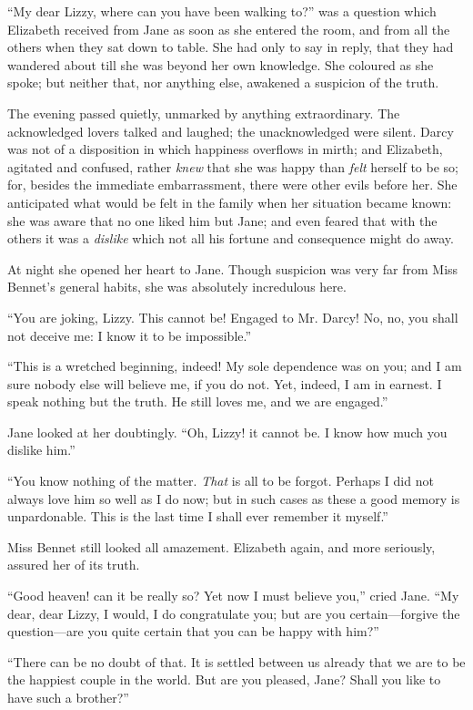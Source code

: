 ``My dear Lizzy, where can you have been walking to?'' was a question which Elizabeth received from Jane as soon as she entered the room, and from all the others when they sat down to table. She had only to say in reply, that they had wandered about till she was beyond her own knowledge. She coloured as she spoke; but neither that, nor anything else, awakened a suspicion of the truth.

The evening passed quietly, unmarked by anything extraordinary. The acknowledged lovers talked and laughed; the unacknowledged were silent. Darcy was not of a disposition in which happiness overflows in mirth; and Elizabeth, agitated and confused, rather \textit{knew} that she was happy than \textit{felt} herself to be so; for, besides the immediate embarrassment, there were other evils before her. She anticipated what would be felt in the family when her situation became known: she was aware that no one liked him but Jane; and even feared that with the others it was a \textit{dislike} which not all his fortune and consequence might do away.

At night she opened her heart to Jane. Though suspicion was very far from Miss Bennet's general habits, she was absolutely incredulous here.

``You are joking, Lizzy. This cannot be! Engaged to Mr. Darcy! No, no, you shall not deceive me: I know it to be impossible.''

``This is a wretched beginning, indeed! My sole dependence was on you; and I am sure nobody else will believe me, if you do not. Yet, indeed, I am in earnest. I speak nothing but the truth. He still loves me, and we are engaged.''

Jane looked at her doubtingly. ``Oh, Lizzy! it cannot be. I know how much you dislike him.''

``You know nothing of the matter. \textit{That} is all to be forgot. Perhaps I did not always love him so well as I do now; but in such cases as these a good memory is unpardonable. This is the last time I shall ever remember it myself.''

Miss Bennet still looked all amazement. Elizabeth again, and more seriously, assured her of its truth.

``Good heaven! can it be really so? Yet now I must believe you,'' cried Jane. ``My dear, dear Lizzy, I would, I do congratulate you; but are you certain---forgive the question---are you quite certain that you can be happy with him?''

``There can be no doubt of that. It is settled between us already that we are to be the happiest couple in the world. But are you pleased, Jane? Shall you like to have such a brother?''

